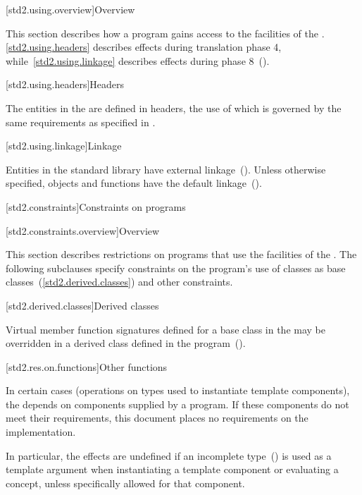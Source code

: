 [std2.using.overview]{Overview}

\pnum
This section describes how a \Cpp program gains access to the facilities of the
. \ref{std2.using.headers} describes effects during translation
phase 4, while~\ref{std2.using.linkage} describes effects during phase
8~().

[std2.using.headers]{Headers}

The entities in the  are defined in headers, the use of which is
governed by the same requirements as specified in .

[std2.using.linkage]{Linkage}

\pnum
Entities in the \Cpp standard library have external
linkage~(). Unless otherwise specified, objects and functions
have the default  linkage~().

[std2.constraints]{Constraints on programs}

[std2.constraints.overview]{Overview}

\pnum
This section describes restrictions on \Cpp programs that use the facilities of
the . The following subclauses specify constraints on the
program's use of  classes as base classes~(\ref{std2.derived.classes})
and other constraints.

[std2.derived.classes]{Derived classes}

\pnum
Virtual member function signatures defined
%
for a base class in the 
%
%
 may be overridden in a derived class defined in the
program~().

[std2.res.on.functions]{Other functions}

\pnum
In certain cases (operations on types used to instantiate 
template components), the  depends on components supplied by a
\Cpp program. If these components do not meet their requirements, this document
places no requirements on the implementation.

\pnum
In particular, the effects are undefined if an incomplete
type~() is used as a template argument when instantiating a
template component or evaluating a concept, unless specifically allowed for that
component.

